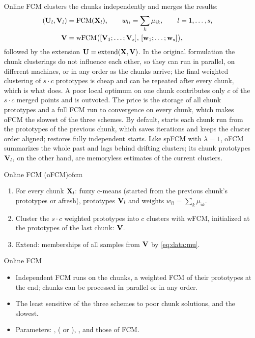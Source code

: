 Online FCM clusters the chunks independently and merges the results:
\begin{equation}
  \begin{aligned}
  (\mathbf{U}_l,\mathbf{V}_l)&=\text{FCM}(\mathbf{X}_l),\qquad w_{li}=\sum_k\mu_{ik},\qquad l=1,\dots,s,\\
  \mathbf{V}&=\text{wFCM}\big([\mathbf{V}_1;\dots;\mathbf{V}_s],\,[\mathbf{w}_1;\dots;\mathbf{w}_s]\big),
  \end{aligned}
  \label{eq:data:o}
\end{equation}
followed by the extension $\mathbf{U}=\text{extend}(\mathbf{X},\mathbf{V})$. In the original formulation the chunk clusterings do not influence each other, so they can run in parallel, on different machines, or in any order as the chunks arrive; the final weighted clustering of $s\cdot c$ prototypes is cheap and can be repeated after every chunk, which is what  does. A poor local optimum on one chunk contributes only $c$ of the $s\cdot c$ merged points and is outvoted. The price is the storage of all chunk prototypes and a full FCM run to convergence on every chunk, which makes oFCM the slowest of the three schemes. By default,  starts each chunk run from the prototypes of the previous chunk, which saves iterations and keeps the cluster order aligned;  restores fully independent starts. Like spFCM with $\lambda=1$, oFCM summarizes the whole past and lags behind drifting clusters; its chunk prototypes $\mathbf{V}_l$, on the other hand, are memoryless estimates of the current clusters.

\begin{algobox}{Online FCM (oFCM)}{ofcm}
\begin{enumerate}[leftmargin=*]
  \item For every chunk $\mathbf{X}_l$: fuzzy c-means (started from the previous chunk's prototypes or afresh), prototypes $\mathbf{V}_l$ and weights $w_{li}=\sum_k\mu_{ik}$.
  \item Cluster the $s\cdot c$ weighted prototypes into $c$ clusters with wFCM, initialized at the prototypes of the last chunk: $\mathbf{V}$.
  \item Extend: memberships of all samples from $\mathbf{V}$ by \eqref{eq:data:mu}.
\end{enumerate}
\end{algobox}
\begin{summarybox}{Online FCM}
\begin{itemize}
  \item Independent FCM runs on the chunks, a weighted FCM of their prototypes at the end; chunks can be processed in parallel or in any order.
  \item The least sensitive of the three schemes to poor chunk solutions, and the slowest.
  \item Parameters: ,  ( or ), , and those of FCM.
\end{itemize}
\end{summarybox}

